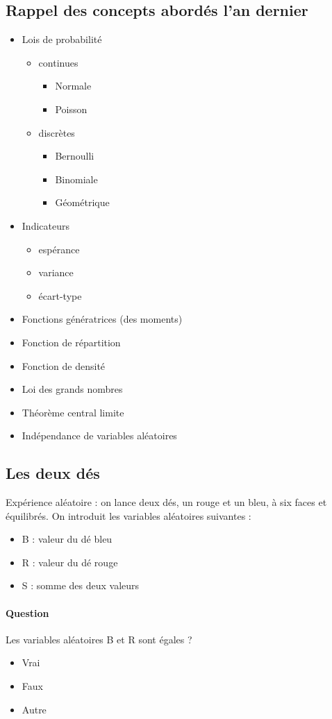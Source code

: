 \documentclass[11pt]{article}
\begin{document}
\subsection{Rappel des concepts abordés l'an dernier}
\begin{itemize}
    \item Lois de probabilité
    \begin{itemize}
        \item continues
        \begin{itemize}
            \item Normale
            \item Poisson
        \end{itemize}
        \item discrètes
        \begin{itemize}
            \item Bernoulli
            \item Binomiale
            \item Géométrique
        \end{itemize}
    \end{itemize}
    \item Indicateurs 
    \begin{itemize}
        \item espérance
        \item variance
        \item écart-type
    \end{itemize}
    \item Fonctions génératrices (des moments)
    \item Fonction de répartition
    \item Fonction de densité
    \item Loi des grands nombres
    \item Théorème central limite
    \item Indépendance de variables aléatoires
\end{itemize}

\subsection{Les deux dés}
Expérience aléatoire : on lance deux dés, un rouge et un bleu, à six faces et
équilibrés.
On introduit les variables aléatoires suivantes :
\begin{itemize}
    \item B : valeur du dé bleu
    \item R : valeur du dé rouge
    \item S : somme des deux valeurs
\end{itemize}

\paragraph{Question} Les variables aléatoires B et R sont égales ? 
\begin{itemize}
    \item Vrai
    \item Faux
    \item Autre
\end{itemize}
\end{document}

